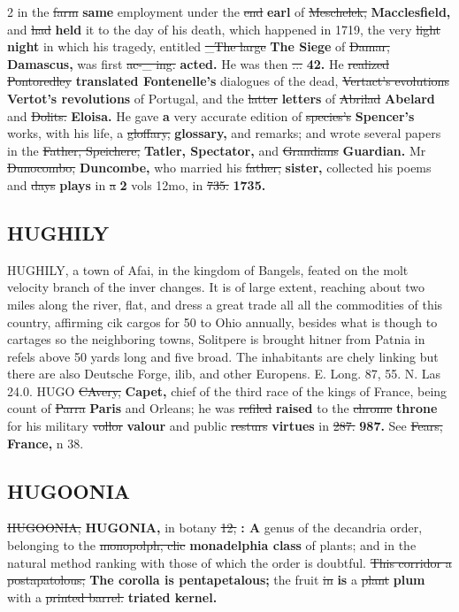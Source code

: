 \documentclass[10pt]{article}
\begin{document}
\begin{multicols}{2}
in the \sout{farm} \textbf{same} employment under the \sout{end} \textbf{earl} of \sout{Meschelek,} \textbf{Macclesfield,} and \sout{had} \textbf{held} it to the day of his death, which happened in 1719, the very \sout{light} \textbf{night} in which his tragedy, entitled \sout{\_The large} \textbf{The Siege} of \sout{Damar,} \textbf{Damascus,} was first \sout{ac-\_ ing.} \textbf{acted.} He was then \sout{...} \textbf{42.} He \sout{realized Pontoredley} \textbf{translated Fontenelle's} dialogues of the dead, \sout{Vertact's evolutions} \textbf{Vertot's revolutions} of Portugal, and the \sout{latter} \textbf{letters} of \sout{Abrilad} \textbf{Abelard} and \sout{Dolits.} \textbf{Eloisa.} He gave \textbf{a} very accurate edition of \sout{species's} \textbf{Spencer's} works, with his life, a \sout{gloffary,} \textbf{glossary,} and remarks; and wrote several papers in the \sout{Father, Speichere,} \textbf{Tatler, Spectator,} and \sout{Grandians} \textbf{Guardian.} Mr \sout{Dunocombo,} \textbf{Duncombe,} who married his \sout{father,} \textbf{sister,} collected his poems and \sout{days} \textbf{plays} in \sout{a} \textbf{2} vols 12mo, in \sout{735.} \textbf{1735.}

\subsection*{HUGHILY}
HUGHILY, a town of Afai, in the kingdom of Bangels, feated on the molt velocity branch of the inver changes. It is of large extent, reaching about two miles along the river, flat, and dress a great trade all all the commodities of this country, affirming cik cargos for 50 to Ohio annually, besides what is though to cartages so the neighboring towns, Solitpere is brought hitner from Patnia in refels above 50 yards long and five broad. The inhabitants are chely linking but there are also Deutsche Forge, ilib, and other Europens. E. Long. 87, 55. N. Las 24.0. HUGO \sout{CAvery,} \textbf{Capet,} chief of the third race of the kings of France, being count of \sout{Parra} \textbf{Paris} and Orleans; he was \sout{refiled} \textbf{raised} to the \sout{chrome} \textbf{throne} for his military \sout{vollor} \textbf{valour} and public \sout{resturs} \textbf{virtues} in \sout{287.} \textbf{987.} See \sout{Fears,} \textbf{France,} n 38.

\subsection*{HUGOONIA}
\sout{HUGOONIA,} \textbf{HUGONIA,} in botany \sout{12,} \textbf{: A} genus of the decandria order, belonging to the \sout{monopolph, clic} \textbf{monadelphia class} of plants; and in the natural method ranking with those of which the order is doubtful. \sout{This corridor a postapatolous;} \textbf{The corolla is pentapetalous;} the fruit \sout{in} \textbf{is} a \sout{plant} \textbf{plum} with a \sout{printed barrel.} \textbf{triated kernel.}


\end{multicols}
\end{document}
